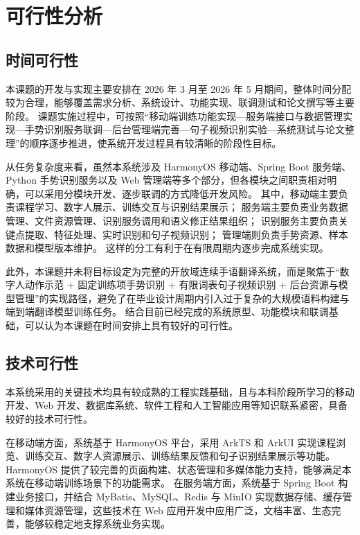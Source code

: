 
\section{可行性分析}

\subsection{时间可行性}

本课题的开发与实现主要安排在 2026 年 3 月至 2026 年 5 月期间，整体时间分配较为合理，能够覆盖需求分析、系统设计、功能实现、联调测试和论文撰写等主要阶段。
课题实施过程中，可按照“移动端训练功能实现—服务端接口与数据管理实现—手势识别服务联调—后台管理端完善—句子视频识别实验—系统测试与论文整理”的顺序逐步推进，使系统开发过程具有较清晰的阶段性目标。

从任务复杂度来看，虽然本系统涉及 HarmonyOS 移动端、Spring Boot 服务端、Python 手势识别服务以及 Web 管理端等多个部分，但各模块之间职责相对明确，可以采用分模块开发、逐步联调的方式降低开发风险。
其中，移动端主要负责课程学习、数字人展示、训练交互与识别结果展示；
服务端主要负责业务数据管理、文件资源管理、识别服务调用和语义修正结果组织；
识别服务主要负责关键点提取、特征处理、实时识别和句子视频识别；
管理端则负责手势资源、样本数据和模型版本维护。
这样的分工有利于在有限周期内逐步完成系统实现。

此外，本课题并未将目标设定为完整的开放域连续手语翻译系统，而是聚焦于“数字人动作示范 + 固定训练项手势识别 + 有限词表句子视频识别 + 后台资源与模型管理”的实现路径，避免了在毕业设计周期内引入过于复杂的大规模语料构建与端到端翻译模型训练任务。
结合目前已经完成的系统原型、功能模块和联调基础，可以认为本课题在时间安排上具有较好的可行性。

\subsection{技术可行性}

本系统采用的关键技术均具有较成熟的工程实践基础，且与本科阶段所学习的移动开发、Web 开发、数据库系统、软件工程和人工智能应用等知识联系紧密，具备较好的技术可行性。

在移动端方面，系统基于 HarmonyOS 平台，采用 ArkTS 和 ArkUI 实现课程浏览、训练交互、数字人资源展示、训练结果反馈和句子识别结果展示等功能。
HarmonyOS 提供了较完善的页面构建、状态管理和多媒体能力支持，能够满足本系统在移动端训练场景下的功能需求\cite{harmonyos-multi-device-deployment}。
在服务端方面，系统基于 Spring Boot 构建业务接口，并结合 MyBatis、MySQL、Redis 与 MinIO 实现数据存储、缓存管理和媒体资源管理，这些技术在 Web 应用开发中应用广泛，文档丰富、生态完善，能够较稳定地支撑系统业务实现。

